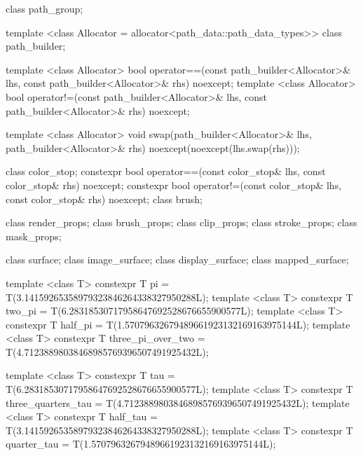 \begin{codeblock}
{{{{  class path_group;

  template <class Allocator = allocator<path_data::path_data_types>>
  class path_builder;

  template <class Allocator>
  bool operator==(const path_builder<Allocator>& lhs, 
    const path_builder<Allocator>& rhs) noexcept;
  template <class Allocator>
  bool operator!=(const path_builder<Allocator>& lhs, 
    const path_builder<Allocator>& rhs) noexcept;
  
  template <class Allocator>
  void swap(path_builder<Allocator>& lhs, path_builder<Allocator>& rhs)
    noexcept(noexcept(lhs.swap(rhs)));

  class color_stop;
  constexpr bool operator==(const color_stop& lhs, const color_stop& rhs)
    noexcept;
  constexpr bool operator!=(const color_stop& lhs, const color_stop& rhs)
    noexcept;
  class brush;

  class render_props;
  class brush_props;
  class clip_props;
  class stroke_props;
  class mask_props;
    
  class surface;
  class image_surface;
  class display_surface;
  class mapped_surface;
  
  template <class T>
  constexpr T pi = T(3.14159265358979323846264338327950288L);
  template <class T>
  constexpr T two_pi = T(6.28318530717958647692528676655900577L);
  template <class T>
  constexpr T half_pi = T(1.57079632679489661923132169163975144L);
  template <class T>
  constexpr T three_pi_over_two = T(4.71238898038468985769396507491925432L);

  template <class T>
  constexpr T tau = T(6.28318530717958647692528676655900577L);
  template <class T>
  constexpr T three_quarters_tau = T(4.71238898038468985769396507491925432L);
  template <class T>
  constexpr T half_tau = T(3.14159265358979323846264338327950288L);
  template <class T>
  constexpr T quarter_tau = T(1.57079632679489661923132169163975144L);

}}}}
\end{codeblock}
